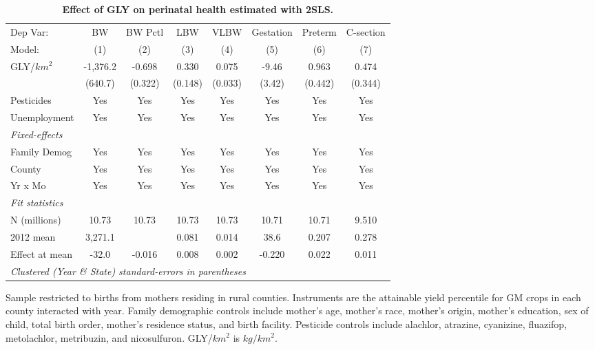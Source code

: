 \begin{table}[htbp]
   \centering
   \begin{threeparttable}[b]
      \caption{\label{tab:main-outcomes} \textbf{Effect of GLY on perinatal health estimated with 2SLS.}}
      \begin{tabular}{lccccccc}
         \toprule
         Dep Var:       & BW       & BW Pctl & LBW     & VLBW    & Gestation & Preterm & C-section\\  
         Model:         & (1)      & (2)     & (3)     & (4)     & (5)       & (6)     & (7)\\  
         \midrule 
         GLY/$km^2$     & -1,376.2 & -0.698  & 0.330   & 0.075   & -9.46     & 0.963   & 0.474\\   
                        & (640.7)  & (0.322) & (0.148) & (0.033) & (3.42)    & (0.442) & (0.344)\\   
         Pesticides     & Yes      & Yes     & Yes     & Yes     & Yes       & Yes     & Yes\\  
         Unemployment   & Yes      & Yes     & Yes     & Yes     & Yes       & Yes     & Yes\\  
         \midrule
         \emph{Fixed-effects}\\
         Family Demog   & Yes      & Yes     & Yes     & Yes     & Yes       & Yes     & Yes\\  
         County         & Yes      & Yes     & Yes     & Yes     & Yes       & Yes     & Yes\\  
         Yr x Mo        & Yes      & Yes     & Yes     & Yes     & Yes       & Yes     & Yes\\  
         \midrule
         \emph{Fit statistics}\\
         N (millions)   & 10.73    & 10.73   & 10.73   & 10.73   & 10.71     & 10.71   & 9.510\\  
         2012 mean      & 3,271.1  &         & 0.081   & 0.014   & 38.6      & 0.207   & 0.278\\  
         Effect at mean & -32.0    & -0.016  & 0.008   & 0.002   & -0.220    & 0.022   & 0.011\\  
         \midrule
         \multicolumn{8}{l}{\emph{Clustered (Year \& State) standard-errors in parentheses}}\\
      \end{tabular}
      
      \begin{tablenotes}\item Sample restricted to births from mothers residing in rural counties. Instruments are the attainable yield percentile for GM crops in each county interacted with year. Family demographic controls include mother's age, mother's race, mother's origin, mother's education, sex of child, total birth order, mother's residence status, and birth facility. Pesticide controls include alachlor, atrazine, cyanizine, fluazifop, metolachlor, metribuzin, and nicosulfuron. GLY/$km^2$ is $kg/km^2$.
      \end{tablenotes}
   \end{threeparttable}
\end{table}

